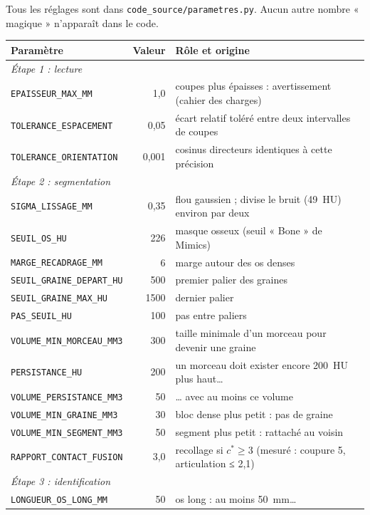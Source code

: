 \documentclass[11pt,a4paper]{article}
\newcommand{\fichier}[1]{\texttt{\small #1}}
\begin{document}
Tous les réglages sont dans \fichier{code\_source/parametres.py}. Aucun autre nombre « magique » n'apparaît dans le
code.

\begin{longtable}{p{5.6cm}rp{7.4cm}}
\toprule
\textbf{Paramètre} & \textbf{Valeur} & \textbf{Rôle et origine} \\
\midrule
\endhead
\multicolumn{3}{l}{\textit{Étape 1 : lecture}} \\
\texttt{EPAISSEUR\_MAX\_MM} & 1,0 & coupes plus épaisses : avertissement (cahier des charges) \\
\texttt{TOLERANCE\_ESPACEMENT} & 0,05 & écart relatif toléré entre deux intervalles de coupes \\
\texttt{TOLERANCE\_ORIENTATION} & 0,001 & cosinus directeurs identiques à cette précision \\
\multicolumn{3}{l}{\textit{Étape 2 : segmentation}} \\
\texttt{SIGMA\_LISSAGE\_MM} & 0,35 & flou gaussien ; divise le bruit (49~HU) environ par deux \\
\texttt{SEUIL\_OS\_HU} & 226 & masque osseux (seuil « Bone » de Mimics) \\
\texttt{MARGE\_RECADRAGE\_MM} & 6 & marge autour des os denses \\
\texttt{SEUIL\_GRAINE\_DEPART\_HU} & 500 & premier palier des graines \\
\texttt{SEUIL\_GRAINE\_MAX\_HU} & 1500 & dernier palier \\
\texttt{PAS\_SEUIL\_HU} & 100 & pas entre paliers \\
\texttt{VOLUME\_MIN\_MORCEAU\_MM3} & 300 & taille minimale d'un morceau pour devenir une graine \\
\texttt{PERSISTANCE\_HU} & 200 & un morceau doit exister encore 200~HU plus haut\ldots \\
\texttt{VOLUME\_PERSISTANCE\_MM3} & 50 & \ldots{} avec au moins ce volume \\
\texttt{VOLUME\_MIN\_GRAINE\_MM3} & 30 & bloc dense plus petit : pas de graine \\
\texttt{VOLUME\_MIN\_SEGMENT\_MM3} & 50 & segment plus petit : rattaché au voisin \\
\texttt{RAPPORT\_CONTACT\_FUSION} & 3,0 & recollage si $c^* \geq 3$ (mesuré : coupure 5, articulation ≤ 2,1) \\
\multicolumn{3}{l}{\textit{Étape 3 : identification}} \\
\texttt{LONGUEUR\_OS\_LONG\_MM} & 50 & os long : au moins 50~mm\ldots \\

\end{longtable}
\end{document}
